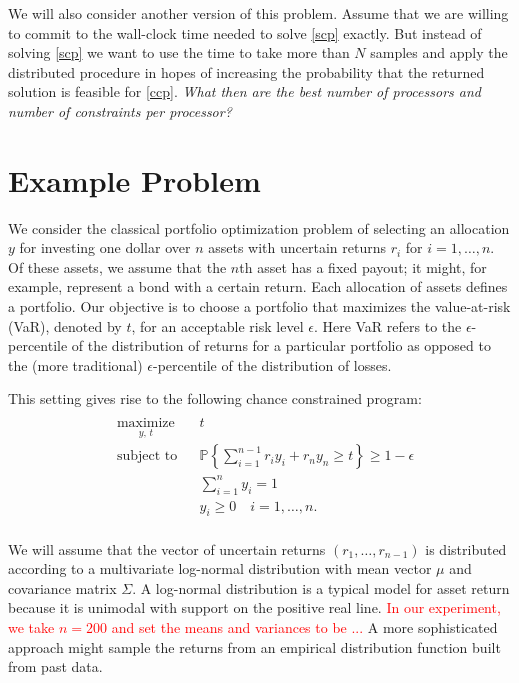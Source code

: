 \documentclass[12pt]{article}
\begin{document}
We will also consider another version of this problem.
Assume that we are willing to commit to the wall-clock time needed to solve \ref{scp} exactly.
But instead of solving \ref{scp} we want to use the time to take more than $N$ samples and apply the distributed procedure in hopes of increasing the probability that the returned solution is feasible for \ref{ccp}.
\textit{What then are the best number of processors and number of constraints per processor?}

\section*{Example Problem}

We consider the classical portfolio optimization problem of selecting an allocation $y$ for investing one dollar over $n$ assets with uncertain returns $r_i$ for $i = 1, \ldots, n$.
Of these assets, we assume that the $n$th asset has a fixed payout; it might, for example, represent a bond with a certain return.
Each allocation of assets defines a portfolio.
Our objective is to choose a portfolio that maximizes the value-at-risk (VaR), denoted by $t$, for an acceptable risk level $\epsilon$.
Here VaR refers to the $\epsilon$-percentile of the distribution of returns for a particular portfolio as opposed to the (more traditional) $\epsilon$-percentile of the distribution of losses.

This setting gives rise to the following chance constrained program:
\begin{align}\label{Portfolioccp}
\begin{split}
\begin{aligned}
    & \underset{y, \,t}{\text{maximize}}
    & & t \\
    & \text{subject to}
    & & \mathbb{P}\left\{ \sum_{i=1}^{n-1} r_i y_i + r_n y_n \geq t \right\} \geq 1-\epsilon \\
    & & & \sum_{i=1}^n y_i = 1 \\
    & & & y_i \geq 0 \quad i = 1, \ldots, n.
\end{aligned}
\end{split} \tag{Portfolio CCP}
\end{align}

We will assume that the vector of uncertain returns $(r_1, \ldots, r_{n-1})$ is distributed according to a multivariate log-normal distribution with mean vector $\mu$ and covariance matrix $\Sigma$.
A log-normal distribution is a typical model for asset return because it is unimodal with support on the positive real line.
\textcolor{red}{In our experiment, we take $n=200$ and set the means and variances to be ...}
A more sophisticated approach might sample the returns from an empirical distribution function built from past data.
\end{document}
